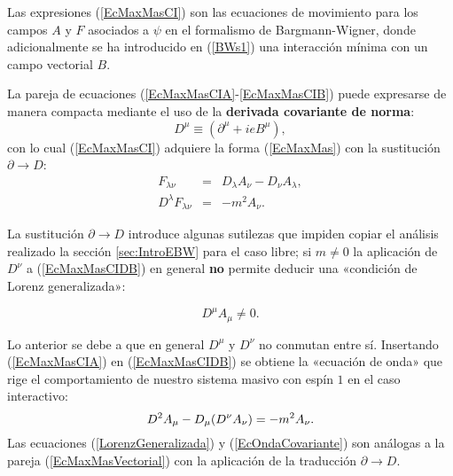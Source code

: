 Las expresiones (\ref{EcMaxMasCI}) son las ecuaciones de movimiento para los campos $A$ y $F$ asociados a $\psi$ en el formalismo de Bargmann-Wigner, donde adicionalmente se ha introducido en (\ref{BWs1}) una interacción mínima con un campo vectorial $B$.

La pareja de ecuaciones (\ref{EcMaxMasCIA}-\ref{EcMaxMasCIB}) puede expresarse de manera compacta mediante el uso de la \textbf{derivada covariante de norma}:
\begin{equation}\label{DerCovNorma}                                                                                                                          
D^\mu\equiv(\partial^\mu+ieB^\mu),
\end{equation}
con lo cual (\ref{EcMaxMasCI}) adquiere la forma (\ref{EcMaxMas}) con la sustitución $\partial \rightarrow D$:
\begin{subequations}\label{EcMaxMasCICov}
 \begin{eqnarray}
  F_{\lambda \nu} & = & D_\lambda A_\nu - D_\nu A_\lambda,\label{EcMaxMasCIDA}\\
  D^{\lambda}F_{\lambda \nu} & = & -m^2 A_\nu. \label{EcMaxMasCIDB}
\end{eqnarray}
\end{subequations}

La sustitución $\partial \rightarrow D$ introduce algunas sutilezas que impiden copiar el análisis realizado la sección \ref{sec:IntroEBW} para el caso libre; si $m\neq 0$ la aplicación de $D^\nu$ a (\ref{EcMaxMasCIDB}) en general \textbf{no} permite deducir una «condición de Lorenz generalizada»:

\begin{equation}\label{LorenzGeneralizada}
 D^\mu A_\mu\neq0.
\end{equation}

Lo anterior se debe a que en general $D^{\mu}$ y $D^{\nu}$ no conmutan entre sí. Insertando (\ref{EcMaxMasCIA}) en (\ref{EcMaxMasCIDB}) se obtiene la «ecuación de onda» que rige el comportamiento de nuestro sistema masivo con espín $1$ en el caso interactivo:
\begin{equation}\label{EcOndaCovariante}
 D^2 A_\mu-D_\mu (D^\nu A_\nu)=-m^2 A_\nu.\\
\end{equation}
Las ecuaciones (\ref{LorenzGeneralizada}) y (\ref{EcOndaCovariante}) son análogas a la pareja (\ref{EcMaxMasVectorial}) con la aplicación de la traducción $\partial \rightarrow D$.

